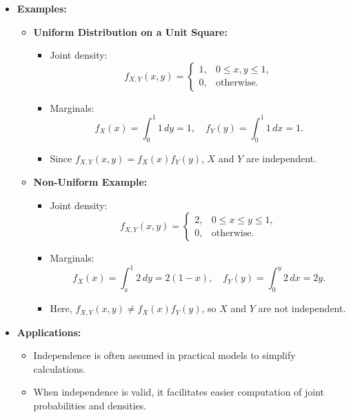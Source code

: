 \documentclass{article}
\begin{document}
\begin{itemize}
  \item \textbf{Examples:}
    \begin{itemize}
      \item \textbf{Uniform Distribution on a Unit Square:}
        \begin{itemize}
          \item Joint density:
            \[
              f_{X,Y}(x,y) =
              \begin{cases}
                1, & 0 \leq x, y \leq 1, \\
                0, & \text{otherwise}.
              \end{cases}
            \]
          \item Marginals:
            \[
              f_X(x) = \int_0^1 1 \, dy = 1, \quad f_Y(y) = \int_0^1 1 \, dx = 1.
            \]
          \item Since $f_{X,Y}(x,y) = f_X(x) f_Y(y)$, $X$ and $Y$ are independent.
        \end{itemize}

      \item \textbf{Non-Uniform Example:}
        \begin{itemize}
          \item Joint density:
            \[
              f_{X,Y}(x,y) =
              \begin{cases}
                2, & 0 \leq x \leq y \leq 1, \\
                0, & \text{otherwise}.
              \end{cases}
            \]
          \item Marginals:
            \[
              f_X(x) = \int_x^1 2 \, dy = 2(1-x), \quad f_Y(y) = \int_0^y 2 \, dx = 2y.
            \]
          \item Here, $f_{X,Y}(x,y) \neq f_X(x) f_Y(y)$, so $X$ and $Y$ are not independent.
        \end{itemize}
    \end{itemize}

  \item \textbf{Applications:}
    \begin{itemize}
      \item Independence is often assumed in practical models to simplify calculations.
      \item When independence is valid, it facilitates easier computation of joint probabilities and densities.
    \end{itemize}


\end{itemize}
\end{document}
